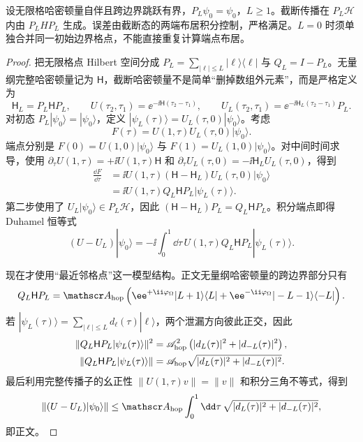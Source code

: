 \begin{proposition}
设无限格哈密顿量自伴且跨边界跳跃有界，$P_L\psi_0=\psi_0$，$L\ge1$。截断传播在 $P_L\mathcal H$ 内由 $P_LHP_L$ 生成。误差由截断态的两端布居积分控制，严格满足。$L=0$ 时须单独合并同一初始边界格点，不能直接重复计算端点布居。
\end{proposition}
\begin{proof}
把无限格点 Hilbert 空间分成
$P_L=\sum_{|\ell|\le L}|\ell\rangle\langle\ell|$ 与 $Q_L=I-P_L$。无量纲完整哈密顿量记为 $\mathsf H$，截断哈密顿量不是简单“删掉数组外元素”，而是严格定义为
\begin{equation*}
 \mathsf H_L=P_L\mathsf H P_L,
 \qquad
 U(\tau_2,\tau_1)=\ee^{-\ii\mathsf H(\tau_2-\tau_1)},
 \qquad
 U_L(\tau_2,\tau_1)=\ee^{-\ii\mathsf H_L(\tau_2-\tau_1)}P_L.
\end{equation*}
对初态 $P_L|\psi_0\rangle=|\psi_0\rangle$，定义
$|\psi_L(\tau)\rangle=U_L(\tau,0)|\psi_0\rangle$。考虑
\begin{equation*}
 F(\tau)=U(1,\tau)U_L(\tau,0)|\psi_0\rangle .
\end{equation*}
端点分别是 $F(0)=U(1,0)|\psi_0\rangle$ 与
$F(1)=U_L(1,0)|\psi_0\rangle$。对中间时间求导，使用
$\partial_\tau U(1,\tau)=+\ii U(1,\tau)\mathsf H$ 和
$\partial_\tau U_L(\tau,0)=-\ii\mathsf H_LU_L(\tau,0)$，得到
\begin{align*}
 \frac{\dd F}{\dd\tau}
 &=\ii U(1,\tau)(\mathsf H-\mathsf H_L)
 U_L(\tau,0)|\psi_0\rangle\\
 &=\ii U(1,\tau)Q_L\mathsf H P_L
 |\psi_L(\tau)\rangle .
\end{align*}
第二步使用了 $U_L|\psi_0\rangle\in P_L\mathcal H$，因此
$(\mathsf H-\mathsf H_L)P_L=Q_L\mathsf H P_L$。积分端点即得 Duhamel 恒等式
\begin{equation*}
 (U-U_L)|\psi_0\rangle
 =-\ii\int_0^1\dd\tau\,
 U(1,\tau)Q_L\mathsf H P_L|\psi_L(\tau)\rangle .
\end{equation*}

现在才使用“最近邻格点”这一模型结构。正文无量纲哈密顿量的跨边界部分只有
\begin{equation*}
 Q_L\mathsf H P_L
 =\mathscr A_{\rm hop}
 \left(
 \ee^{+\ii\varphi_\Omega}|L+1\rangle\langle L|
 +\ee^{-\ii\varphi_\Omega}|-L-1\rangle\langle-L|
 \right).
\end{equation*}
若
$|\psi_L(\tau)\rangle=\sum_{|\ell|\le L}d_\ell(\tau)|\ell\rangle$，两个泄漏方向彼此正交，因此
\begin{align*}
 \|Q_L\mathsf H P_L|\psi_L(\tau)\rangle\|^2
 &=\mathscr A_{\rm hop}^2
 \left(|d_L(\tau)|^2+|d_{-L}(\tau)|^2\right),\\
 \|Q_L\mathsf H P_L|\psi_L(\tau)\rangle\|
 &=\mathscr A_{\rm hop}
 \sqrt{|d_L(\tau)|^2+|d_{-L}(\tau)|^2}.
\end{align*}
最后利用完整传播子的幺正性
$\|U(1,\tau)v\|=\|v\|$ 和积分三角不等式，得到
\begin{equation*}
 \|(U-U_L)|\psi_0\rangle\|
 \le\mathscr A_{\rm hop}\int_0^1\dd\tau\,
 \sqrt{|d_L(\tau)|^2+|d_{-L}(\tau)|^2},
\end{equation*}
即正文。
\end{proof}


